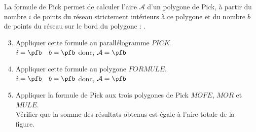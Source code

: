    La formule de Pick permet de calculer l'aire $\mathcal{A}$ d'un polygone de Pick, à partir du nombre $i$ de points du réseau strictement intérieurs à ce polygone et du nombre $b$ de points du réseau sur le bord du polygone : . 
   \begin{enumerate}
   \setcounter{enumi}{2}
      \item Appliquer cette formule au parallélogramme $PICK$. \\ [3mm]
         $i =\pfb \quad b =\pfb$ \quad donc, $\mathcal{A} = \pfb$ \\
       \item Appliquer cette formule au polygone $FORMULE$. \\ [3mm]
         $i =\pfb \quad b =\pfb$ \quad donc, $\mathcal{A} = \pfb$ \\
       \item Appliquer la formule de Pick aux trois polygones de Pick $MOFE$, $MOR$ et $MULE$. \\
         Vérifier que la somme des résultats obtenus est égale à l'aire totale de la figure. \\ [3mm]
         \pf \\ [3mm]
         \pf \\ [3MM]
         \pf
   \end{enumerate}

